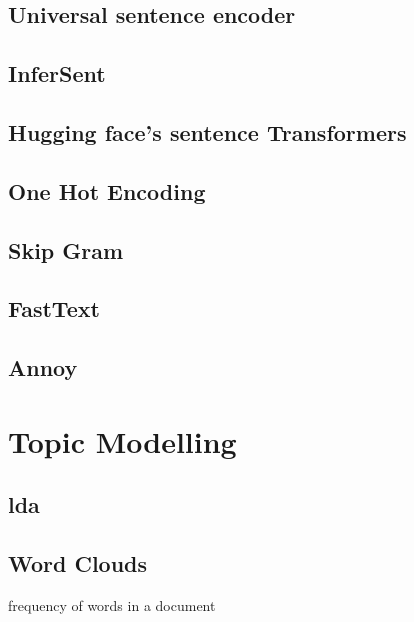 \subsection{Universal sentence encoder}\label{subsec:univ-sent-encoder}

\subsection{InferSent}\label{subsec:inferSent}

\subsection{Hugging face's sentence Transformers}\label{subsec:hf-sent-ransformers}

\subsection{One Hot Encoding}\label{subsec:one-hot-encoding}

\subsection{Skip Gram}\label{subsec:skip-gram}

\subsection{FastText}\label{subsec:fasttext}

\subsection{Annoy}\label{subsec:glove}


\section{Topic Modelling}\label{sec:topic-modelling}

\subsection{\ac{lda}}\label{subsec:latent-dirichlet-allocation}

\subsection{Word Clouds}\label{subsec:word-clouds}
frequency of words in a document


